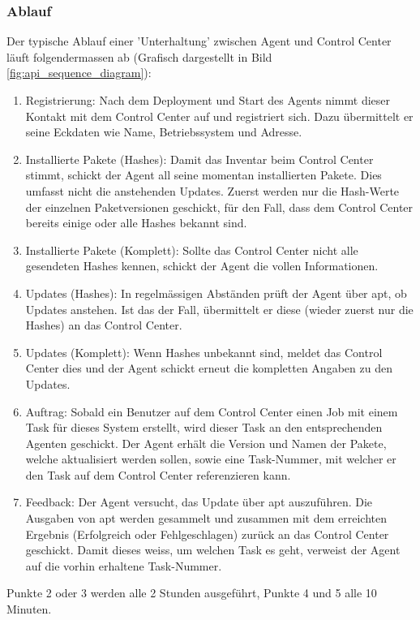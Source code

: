 \subsubsection*{Ablauf}

Der typische Ablauf einer 'Unterhaltung' zwischen Agent und Control Center läuft folgendermassen ab (Grafisch dargestellt in Bild \ref{fig:api_sequence_diagram}):

\begin{enumerate}
    \item Registrierung: Nach dem Deployment und Start des Agents nimmt dieser Kontakt mit dem Control Center auf und registriert sich. Dazu übermittelt er seine Eckdaten wie Name, Betriebssystem und Adresse.
    \item Installierte Pakete (Hashes): Damit das Inventar beim Control Center stimmt, schickt der Agent all seine momentan installierten Pakete. Dies umfasst nicht die anstehenden Updates. Zuerst werden nur die Hash-Werte der einzelnen Paketversionen geschickt, für den Fall, dass dem Control Center bereits einige oder alle Hashes bekannt sind.
    \item Installierte Pakete (Komplett): Sollte das Control Center nicht alle gesendeten Hashes kennen, schickt der Agent die vollen Informationen.
    \item Updates (Hashes): In regelmässigen Abständen prüft der Agent über \gls{apt}, ob Updates anstehen. Ist das der Fall, übermittelt er diese (wieder zuerst nur die Hashes) an das Control Center.
    \item Updates (Komplett): Wenn Hashes unbekannt sind, meldet das Control Center dies und der Agent schickt erneut die kompletten Angaben zu den Updates.
    \item Auftrag: Sobald ein Benutzer auf dem Control Center einen Job mit einem Task für dieses System erstellt, wird dieser Task an den entsprechenden Agenten geschickt. Der Agent erhält die Version und Namen der Pakete, welche aktualisiert werden sollen, sowie eine Task-Nummer, mit welcher er den Task auf dem Control Center referenzieren kann.
    \item Feedback: Der Agent versucht, das Update über \gls{apt} auszuführen. Die Ausgaben von apt werden gesammelt und zusammen mit dem erreichten Ergebnis (Erfolgreich oder Fehlgeschlagen) zurück an das Control Center geschickt. Damit dieses weiss, um welchen Task es geht, verweist der Agent auf die vorhin erhaltene Task-Nummer.
\end{enumerate}

Punkte 2 oder 3 werden alle 2 Stunden ausgeführt, Punkte 4 und 5 alle 10 Minuten.